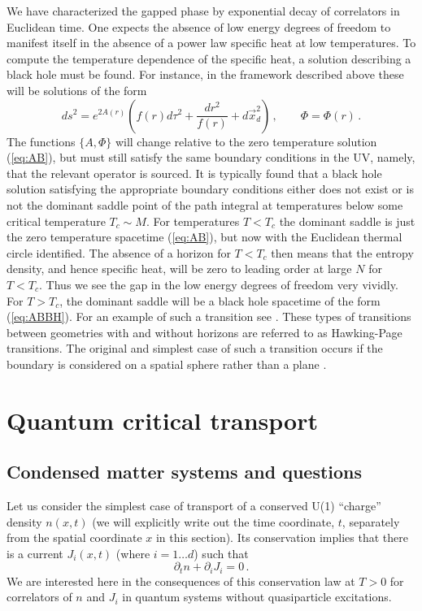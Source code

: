 \documentclass[10pt, oneside]{book}
\def\be{\begin{equation}}
\def\ee{\end{equation}}
\begin{document}
\begin{doublespace}
We have characterized the gapped phase by exponential decay of correlators in Euclidean time. One expects the absence of low energy degrees of freedom to manifest itself in the absence of a power law specific heat at low temperatures. To compute the temperature dependence of the specific heat, a solution describing a black hole must be found. For instance, in the framework described above these will be solutions of the form
\be\label{eq:ABBH}
ds^2 = e^{2 A(r)} \left(f(r) d\tau^2 + \frac{dr^2}{f(r)} + d\vec x^2_{d} \right) \,, \qquad \Phi = \Phi(r) \,.
\ee
The functions $\{A,\Phi\}$ will change relative to the zero temperature solution (\ref{eq:AB}), but must still satisfy the same boundary conditions in the UV, namely, that the relevant operator is sourced. It is typically found that a black hole solution satisfying the appropriate boundary conditions either does not exist or is not the dominant saddle point of the path integral at temperatures below some critical temperature $T_c \sim M$. For temperatures $T < T_c$ the dominant saddle is just the zero temperature spacetime (\ref{eq:AB}), but now with the Euclidean thermal circle identified. The absence of a horizon for $T < T_c$ then means that the entropy density, and hence specific heat, will be zero to leading order at large $N$ for $T < T_c$. Thus we see the gap in the low energy degrees of freedom very vividly. For $T > T_c$, the dominant saddle will be a black hole spacetime of the form (\ref{eq:ABBH}). For an example of such a transition see \cite{Witten:1998zw, Mateos:2007ay}. These types of transitions between geometries with and without horizons are referred to as Hawking-Page transitions. The original and simplest case of such a transition occurs if the boundary is considered on a spatial sphere rather than a plane \cite{Hawking:1982dh, Witten:1998qj, Witten:1998zw, Aharony:2003sx}.


\section{Quantum critical transport}
\label{sec:qctransport}

\subsection{Condensed matter systems and questions}
\label{sec:cmtransport}

Let us consider the simplest case of transport of a conserved U(1) ``charge'' density $n (x, t)$
(we will explicitly write out the time coordinate, $t$, separately from the spatial coordinate $x$ in this
section). Its conservation implies that there is a current $J_i (x,t)$ (where $i =1\ldots d$) such that
\be
\partial_t n + \partial_i J_i = 0 \,.
\ee
We are interested here in the consequences of this conservation law at $T>0$ for correlators of $n$ and $J_i$ in quantum systems
without quasiparticle excitations.


\end{doublespace}
\end{document}
